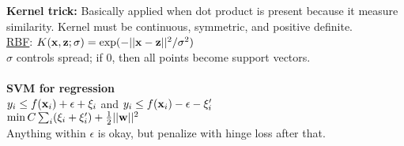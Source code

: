 \textbf{Kernel trick:}
Basically applied when dot product is present because it measure similarity. Kernel must be continuous, symmetric, and positive definite.\\
\underline{RBF}: $K({\textrm{\textbf{x}}}, \textrm{\textbf{z}}; \sigma) = \exp(-||{\textrm{\textbf{x}}}-\textrm{\textbf{z}}||^2/\sigma^2)$\\
$\sigma$ controls spread; if 0, then all points become support vectors.\\\\
\textbf{SVM for regression}\\
$y_i \leq f({\textrm{\textbf{x}}}_i) + \epsilon + \xi_i$ and $y_i \leq f({\textrm{\textbf{x}}}_i) - \epsilon - \xi'_i$\\
$\min C\sum_i (\xi_i + \xi'_i) + \frac{1}{2}||{\textrm{\textbf{w}}}||^2$\\
Anything within $\epsilon$ is okay, but penalize with hinge loss after that.